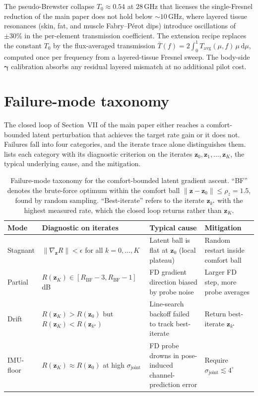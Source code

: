 \documentclass[10pt,journal,twocolumn]{IEEEtran}
\newcommand{\gammab}{\bm{\gamma}}
\newcommand{\Tepskin}{T_{0}}
\newcommand{\diff}{\mathrm{d}}
\theoremstyle{plain}
\theoremstyle{definition}
\begin{document}
The pseudo-Brewster collapse $\Tepskin \approx 0.54$ at $28\,$GHz
that licenses the single-Fresnel reduction of the main paper does
not hold below ${\sim}10\,$GHz, where layered tissue resonances
(skin, fat, and muscle Fabry--P\'{e}rot dips) introduce oscillations
of $\pm 30\%$ in the per-element transmission coefficient. The
extension recipe replaces the constant $\Tepskin$ by the
flux-averaged transmission
$\bar{T}(f) = 2\int_0^1 T_\mathrm{avg}(\mu, f)\,\mu\,\diff\mu$,
computed once per frequency from a layered-tissue Fresnel sweep.
The body-side $\gammab$ calibration absorbs any residual layered
mismatch at no additional pilot cost.

\section{Failure-mode taxonomy}\label{si:failure-modes}

The closed loop of Section~VII of the main paper either reaches a
comfort-bounded latent perturbation that achieves the target rate
gain or it does not. Failures fall into four categories, and the
iterate trace alone distinguishes them. 
lists each category with its diagnostic criterion on the iterates
$\bm{z}_0, \bm{z}_1, \ldots, \bm{z}_K$, the typical underlying
cause, and the mitigation.

\begin{table}[!t]
\centering
\caption{Failure-mode taxonomy for the comfort-bounded latent
gradient ascent. ``BF'' denotes the brute-force optimum within the
comfort ball $\|\bm{z} - \bm{z}_0\| \leq \rho_z = 1.5$, found by
random sampling. ``Best-iterate'' refers to the iterate
$\bm{z}_{k^\star}$ with the highest measured rate, which the closed
loop returns rather than $\bm{z}_K$.}
\label{tab:failure-modes}
\footnotesize
\begin{tabular}{@{}lp{}p{}p{}@{}}
\toprule
Mode & Diagnostic on iterates & Typical cause & Mitigation \\
\midrule
Stagnant
  & $\|\nabla_{\bm{z}} R\| < \epsilon$ for all $k = 0, \ldots, K$
  & Latent ball is flat at $\bm{z}_0$ (local plateau)
  & Random restart inside comfort ball \\[2pt]
Partial
  & $R(\bm{z}_K) \in [R_\mathrm{BF} - 3, R_\mathrm{BF} - 1]\,$dB
  & FD gradient direction biased by probe noise
  & Larger FD step, more probe averages \\[2pt]
Drift
  & $R(\bm{z}_K) > R(\bm{z}_0)$ but $R(\bm{z}_K) < R(\bm{z}_{k^\star})$
  & Line-search backoff failed to track best-iterate
  & Return best-iterate $\bm{z}_{k^\star}$ \\[2pt]
IMU-floor
  & $R(\bm{z}_K) \approx R(\bm{z}_0)$ at high $\sigma_\mathrm{joint}$
  & FD probe drowns in pose-induced channel-prediction error
  & Require $\sigma_\mathrm{joint} \lesssim 4^{\circ}$ \\
\bottomrule
\end{tabular}
\end{table}
\end{document}
